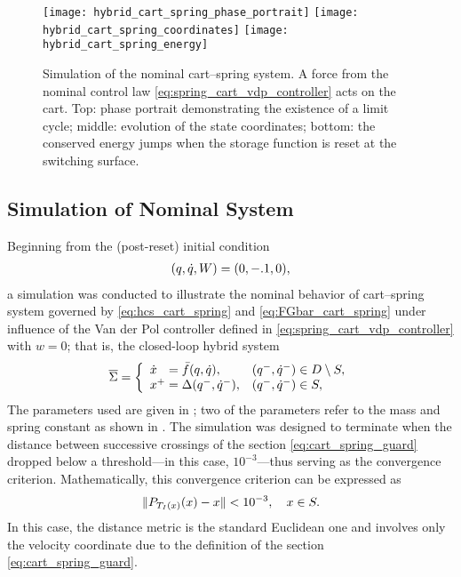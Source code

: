 \begin{figure*}[htp!]
  \centering
  \texttt{[image: hybrid\_cart\_spring\_phase\_portrait]}
  \texttt{[image: hybrid\_cart\_spring\_coordinates]}
  \texttt{[image: hybrid\_cart\_spring\_energy]}
  \caption[Simulation of the nominal cart--spring system.]{Simulation of the
    nominal cart--spring system.
    A force from the nominal control law \eqref{eq:spring_cart_vdp_controller}
    acts on the cart.
    Top: phase portrait demonstrating the existence of a limit cycle;
    middle: evolution of the state coordinates;
    bottom: the conserved energy jumps when the storage function is reset at the
    switching surface.}
  \label{fig:cart_spring_simulation_nominal}
\end{figure*}


\subsection{Simulation of Nominal System}
Beginning from the (post-reset) initial condition
\begin{align*}
  (q, \dot{q}, W) = (0, -.1, 0),
\end{align*}
a simulation was conducted to illustrate the nominal behavior of cart--spring
system governed by \eqref{eq:hcs_cart_spring} and \eqref{eq:FGbar_cart_spring}
under influence of the Van der Pol controller defined in
\eqref{eq:spring_cart_vdp_controller} with $w = 0$;
% 
that is, the closed-loop hybrid system
\begin{align}
  \label{eq:hs_cart_spring_nominal}
  {\overline {\Sigma}} = \left\{
    \begin{array}{l l}
      {\dot {x}}\hphantom{^+} = {\bar {f}}(q, \dot{q}), & (q^{-}, \dot{q}^{-}) \in D \setminus S,\\
      x^{+} = \Delta(q^{-}, \dot{q}^{-}), & (q^{-}, \dot{q}^{-}) \in S,
    \end{array}\right.
\end{align}
% 
The parameters used are given in ; two of the
parameters refer to the mass and spring constant as shown in .
% 
The simulation was designed to terminate when the distance between successive
crossings of the \Poincare{} section \eqref{eq:cart_spring_guard} dropped below
a threshold---in this case, $10^{-3}$---thus serving as the convergence
criterion.
% 
Mathematically, this convergence criterion can be expressed as
\begin{align}
  \label{eq:cart_spring_convergence}
  \| P_{T_{I}(x)}(x) - x \| < 10^{-3}, \quad x \in S.
\end{align}
% 
In this case, the distance metric is the standard Euclidean one and involves
only the velocity coordinate due to the definition of the \Poincare{} section
\eqref{eq:cart_spring_guard}.

